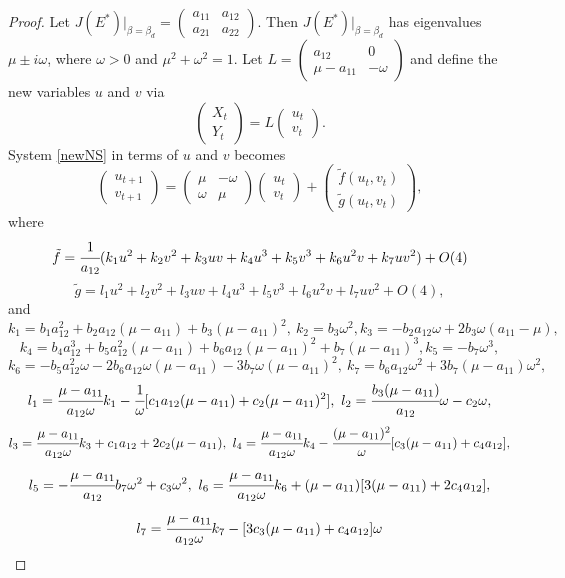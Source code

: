 \documentclass[11pt]{article}
\begin{document}
\begin{proof}
Let $J(E^*)|_{\beta=\beta_d}=\left(\begin{array}{ll} a_{11} &
a_{12}\\
a_{21} & a_{22}\end{array}\right).$ Then $J(E^*)|_{\beta=\beta_d}$
has eigenvalues $\mu\pm i\omega$, where  $\omega>0$ and
$\mu^2+\omega^2=1$. Let $L=\left(\begin{array}{ll} a_{12} &
0\\
\mu-a_{11} & -\omega\end{array}\right)$ and define the new
variables $u$ and $v$ via
\begin{equation}\label{lin}\left(\begin{array}{l}
X_t\\Y_t\end{array}\right)=L\left(\begin{array}{l}u_t\\v_t\end{array}\right).\end{equation}
System \eqref{newNS} in terms of $u$ and $v$ becomes
\begin{equation}\left(\begin{array}{l}u_{t+1}\\v_{t+1}\end{array}\right)=\left(\begin{array}{lc}\mu
& -\omega\\\omega &
\mu\end{array}\right)\left(\begin{array}{l}u_t\\v_t\end{array}\right)+\left(\begin{array}{l}{\tilde f}(u_t,v_t)\\
{\tilde g}(u_t,v_t)\end{array}\right),
\end{equation}
where $${\tilde
f}=\cfrac{1}{a_{12}}(k_1u^2+k_2v^2+k_3uv+k_4u^3+k_5v^3+k_6u^2v+k_7uv^2)+O(4)$$
 $${\tilde
g}=l_1u^2+l_2v^2+l_3uv+l_4u^3+l_5v^3+l_6u^2v+l_7uv^2+O(4),$$ and
$$k_1=b_1a_{12}^2+b_2a_{12}(\mu-a_{11})+b_3(\mu-a_{11})^2, \
k_2=b_3\omega^2, k_3=-b_2a_{12}\omega+2b_3\omega(a_{11}-\mu),$$
$$k_4=b_4a_{12}^3+b_5a_{12}^2(\mu-a_{11})+b_6a_{12}(\mu-a_{11})^2+b_7(\mu-a_{11})^3,
k_5=-b_7\omega^3,$$
$$k_6=-b_5a_{12}^2\omega-2b_6a_{12}\omega(\mu-a_{11})-3b_7\omega(\mu-a_{11})^2, \ k_7=b_6a_{12}\omega^2+3b_7(\mu-a_{11})\omega^2,$$
$$l_1=\cfrac{\mu-a_{11}}{a_{12}\omega}k_1-\cfrac{1}{\omega}[c_1a_{12}(\mu-a_{11})+c_2(\mu-a_{11})^2], \ l_2=\cfrac{b_3(\mu-a_{11})}{a_{12}}\omega-c_2\omega,$$
$$l_3=\cfrac{\mu-a_{11}}{a_{12}\omega}k_3+c_1a_{12}+2c_2(\mu-a_{11}),
\
l_4=\cfrac{\mu-a_{11}}{a_{12}\omega}k_4-\cfrac{(\mu-a_{11})^2}{\omega}[c_3(\mu-a_{11})+c_4a_{12}],$$
$$l_5=-\cfrac{\mu-a_{11}}{a_{12}}b_7\omega^2+c_3\omega^2, \
l_6=\cfrac{\mu-a_{11}}{a_{12}\omega}k_6+(\mu-a_{11})[3(\mu-a_{11})+2c_4a_{12}],$$
$$l_7=\cfrac{\mu-a_{11}}{a_{12}\omega}k_7-[3c_3(\mu-a_{11})+c_4a_{12}]\omega$$


\end{proof}
\end{document}
